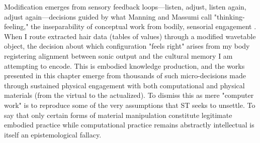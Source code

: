 Modification emerges from sensory feedback loops---listen, adjust, listen again, adjust again---decisions guided by what Manning and Massumi call "thinking-feeling," the inseparability of conceptual work from bodily, sensorial engagement \parencite[41-42]{Manning_Massumi_2014}. When I route extracted hair data (tables of values) through a modified wavetable object, the decision about which configuration "feels right" arises from my body registering alignment between sonic output and the cultural memory I am attempting to encode. This is embodied knowledge production, and the works presented in this chapter emerge from thousands of such micro-decisions made through sustained physical engagement with both computational and physical materials (from the virtual to the actualized). To dismiss this as mere "computer work" is to reproduce some of the very assumptions that ST seeks to unsettle. To say that only certain forms of material manipulation constitute legitimate embodied practice while computational practice remains abstractly intellectual is itself an epistemological fallacy.